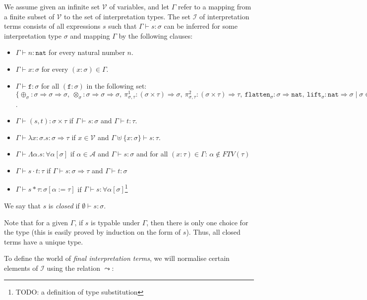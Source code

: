 \documentclass[runningheads,a4paper]{llncs}
\newcommand{\Iterms}{\mathcal{I}}
\newcommand{\Typevars}{\mathcal{A}}
\newcommand{\Vars}{\mathcal{V}}
\newcommand{\ITypes}{\mathcal{Y}}
\newcommand{\quant}[2]{\forall #1[#2]}
\newcommand{\arrtype}{\Rightarrow}
\newcommand{\abs}[2]{\lambda #1.#2}
\newcommand{\tabs}[2]{\Lambda #1.#2}
\newcommand{\app}[2]{#1 \cdot #2}
\newcommand{\tapp}[2]{#1 * #2}
\newcommand{\subst}[2]{#1:=#2}
\newcommand{\FTV}{\mathit{FTV}}
\newcommand{\nat}{\mathtt{nat}}
\newcommand{\proj}{\pi}
\newcommand{\flatten}{\mathtt{flatten}}
\newcommand{\lift}{\mathtt{lift}}
\begin{document}
\begin{definition}
We assume given an infinite set $\Vars$ of variables, and let $\Gamma$
refer to a mapping from a finite subset of $\Vars$ to the set of
interpretation types.  The set $\Iterms$ of interpretation terms consists
of all expressions $s$ such that $\Gamma \vdash s : \sigma$ can be
inferred for some interpretation type $\sigma$ and mapping $\Gamma$ by
the following clauses:
\begin{itemize}
\item $\Gamma \vdash n : \nat$ for every natural number $n$.
\item $\Gamma \vdash x : \sigma$ for every $(x : \sigma) \in \Gamma$.
\item $\Gamma \vdash \mathtt{f} : \sigma$ for all $(\mathtt{f} :
  \sigma)$ in the following set: $\{ \oplus_\sigma : \sigma \arrtype
  \sigma \arrtype \sigma,\ \otimes_\sigma : \sigma \arrtype \sigma \arrtype
  \sigma,\ \proj^1_{\sigma,\tau} : (\sigma \times \tau) \arrtype
  \sigma,\ \proj^2_{\sigma,\tau} : (\sigma \times \tau) \arrtype \tau,\ 
  \flatten_{\sigma} : \sigma \arrtype \nat,\ 
  \lift_{\sigma} : \nat \arrtype \sigma
  \mid \sigma \in \ITypes \}$.
\item $\Gamma \vdash (s,t) : \sigma \times \tau$ if $\Gamma \vdash s :
  \sigma$ and $\Gamma \vdash t : \tau$.
\item $\Gamma \vdash \abs{x:\sigma}{s} : \sigma \arrtype \tau$ if $x
  \in \Vars$ and $\Gamma \uplus \{ x : \sigma \} \vdash s : \tau$.
\item $\Gamma \vdash \tabs{\alpha}{s} : \quant{\alpha}{\sigma}$ if
  $\alpha \in \Typevars$ and $\Gamma \vdash s : \sigma$ and for all
  $(x : \tau) \in \Gamma$: $\alpha \notin \FTV(\tau)$
\item $\Gamma \vdash \app{s}{t} : \tau$ if $\Gamma \vdash s :
  \sigma \arrtype \tau$ and $\Gamma \vdash t : \sigma$
\item $\Gamma \vdash \tapp{s}{\tau} : \sigma[\subst{\alpha}{\tau}]$ if
  $\Gamma \vdash s : \quant{\alpha}{\sigma}$\footnote{TODO: a
  definition of type substitution}
\end{itemize}
We say that $s$ is \emph{closed} if $\emptyset \vdash s : \sigma$.
\end{definition}

Note that for a given $\Gamma$, if $s$ is typable under $\Gamma$, then
there is only one choice for the type (this is easily proved by
induction on the form of $s$).  Thus, all closed terms have a unique
type.

\medskip
To define the world of \emph{final interpretation terms}, we will
normalise certain elements of $\Iterms$ using the relation $\leadsto$:
\end{document}
